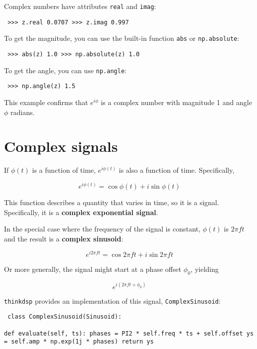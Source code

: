 \documentclass[12pt]{book} \usepackage[width=5.5in,height=8.5in, hmarginratio=3:2,vmarginratio=1:1]{geometry}
\begin{document}
Complex numbers have attributes {\tt real} and {\tt imag}: 

\begin{verbatim} >>> z.real 0.0707 >>> z.imag 0.997 \end{verbatim} 

To get the magnitude, you can use the built-in function {\tt abs} or {\tt np.absolute}: 

\begin{verbatim} >>> abs(z) 1.0 >>> np.absolute(z) 1.0 \end{verbatim} 

To get the angle, you can use {\tt np.angle}: 

\begin{verbatim} >>> np.angle(z) 1.5 \end{verbatim} 

This example confirms that $e^{i \phi}$ is a complex number with magnitude 1 and angle $\phi$ radians. 

\section{Complex signals} 

If $\phi(t)$ is a function of time, $e^{i \phi(t)}$ is also a function of time. Specifically, 

%
\[ e^{i \phi(t)} = \cos \phi(t) + i \sin \phi(t) \] 

%
This function describes a quantity that varies in time, so it is a signal. Specifically, it is a {\bf complex exponential signal}. 

In the special case where the frequency of the signal is constant, $\phi(t)$ is $2 \pi f t$ and the result is a {\bf complex sinusoid}: 

%
\[ e^{i 2 \pi f t} = \cos 2 \pi f t + i \sin 2 \pi f t \] 

%
Or more generally, the signal might start at a phase offset $\phi_0$, yielding 

%
\[ e^{i (2 \pi f t + \phi_0)} \] 

%
{\tt thinkdsp} provides an implementation of this signal, {\tt ComplexSinusoid}: 

\begin{verbatim} class ComplexSinusoid(Sinusoid): 

def evaluate(self, ts): phases = PI2 * self.freq * ts + self.offset ys = self.amp * np.exp(1j * phases) return ys \end{verbatim} 
\end{document}
